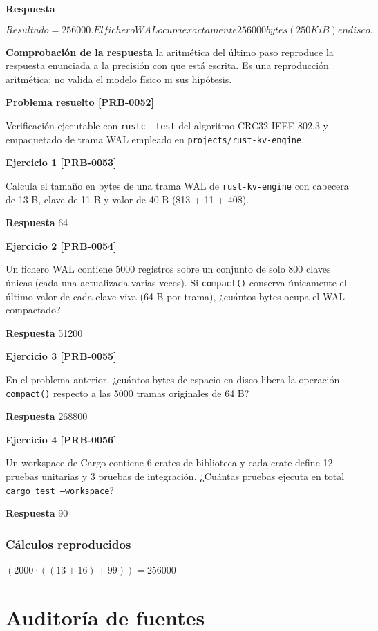 \documentclass{book}
\begin{document}
\noindent\textbf{Respuesta}

\[
Resultado = 256000. El fichero WAL ocupa exactamente 256 000 bytes (250 KiB) en disco.
\]

\noindent\textbf{Comprobación de la respuesta} la aritmética del último paso reproduce la respuesta enunciada a la precisión con que está escrita. Es una reproducción aritmética; no valida el modelo físico ni sus hipótesis.

\noindent\textbf{Problema resuelto [PRB-0052]}

Verificación ejecutable con \texttt{rustc --test} del algoritmo CRC32 IEEE 802.3 y empaquetado de trama WAL empleado en \texttt{projects/rust-kv-engine}.

\noindent\textbf{Ejercicio 1 [PRB-0053]}

Calcula el tamaño en bytes de una trama WAL de \texttt{rust-kv-engine} con cabecera de 13 B, clave de 11 B y valor de 40 B (\$13 + 11 + 40\$).

\noindent\textbf{Respuesta} 64

\noindent\textbf{Ejercicio 2 [PRB-0054]}

Un fichero WAL contiene 5000 registros sobre un conjunto de solo 800 claves únicas (cada una actualizada varias veces). Si \texttt{compact()} conserva únicamente el último valor de cada clave viva (64 B por trama), ¿cuántos bytes ocupa el WAL compactado?

\noindent\textbf{Respuesta} 51200

\noindent\textbf{Ejercicio 3 [PRB-0055]}

En el problema anterior, ¿cuántos bytes de espacio en disco libera la operación \texttt{compact()} respecto a las 5000 tramas originales de 64 B?

\noindent\textbf{Respuesta} 268800

\noindent\textbf{Ejercicio 4 [PRB-0056]}

Un workspace de Cargo contiene 6 crates de biblioteca y cada crate define 12 pruebas unitarias y 3 pruebas de integración. ¿Cuántas pruebas ejecuta en total \texttt{cargo test --workspace}?

\noindent\textbf{Respuesta} 90

\subsection*{Cálculos reproducidos}

\(\left(2000\cdot \left(\left(13+16\right)+99\right)\right) = 256000\)
\chapter{Auditoría de fuentes}
\end{document}
